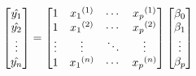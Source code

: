 \documentclass[preview]{standalone}
\begin{document}
\begin{align*}
\special{dvisvgm:raw <g id='unique000'>}\begin{bmatrix}\hat{y_1}\\\hat{y_2}\\\vdots\\\hat{y_n}\end{bmatrix}=\begin{bmatrix}1&{x_1}^{(1)}&\cdots&{x_p}^{(1)}\\1&{x_1}^{(2)}&\cdots&{x_p}^{(2)}\\\vdots&\vdots&\ddots&\vdots\\1&{x_1}^{(n)}&\cdots&{x_p}^{(n)}\end{bmatrix}\begin{bmatrix}\beta_0\\\beta_1\\\vdots\\\beta_p\end{bmatrix}\special{dvisvgm:raw </g>}
\end{align*}
\end{document}
